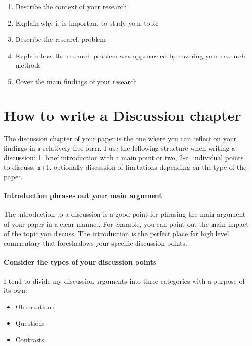\begin{enumerate}
    \item Describe the context of your research
    \item Explain why it is important to study your topic
    \item Describe the research problem
    \item Explain how the research problem was approached by covering your research methods
    \item Cover the main findings of your research
\end{enumerate}


\section{How to write a Discussion chapter}

The discussion chapter of your paper is the one where you can reflect on your findings in a relatively free form.
I use the following structure when writing a discussion: 1. brief introduction with a main point or two, 2-n. individual points to discuss, n+1. optionally discussion of limitations depending on the type of the paper.

\paragraph{Introduction phrases out your main argument}

The introduction to a discussion is a good point for phrasing the main argument of your paper in a clear manner.
For example, you can point out the main impact of the topic you discuss.
The introduction is the perfect place for high level commentary that foreshadows your specific discussion points.

\paragraph{Consider the types of your discussion points}

I tend to divide my discussion arguments into three categories with a purpose of its own:

\begin{itemize}
    \item Observations
    \item Questions
    \item Contrasts
\end{itemize}

